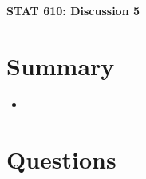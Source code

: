 \documentclass[12pt]{extarticle}
\begin{document}
\begin{center}
{\large \bf STAT 610: Discussion 5}
\end{center}
\vspace{0.22cm}

\section{Summary}
\begin{itemize}
	\item
    
\end{itemize}

\newpage
\section{Questions}
 
\end{document}
